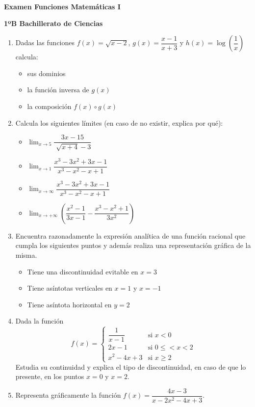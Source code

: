 \documentclass[11pt,a4paper]{article}
\begin{document}
\centerline{{\Large \textbf{Examen Funciones Matemáticas I}}}
\centerline{{\Large \textbf{1ºB Bachillerato de Ciencias}}}

\begin{enumerate}
\item Dadas las funciones $f(x)=\sqrt{x-2}$, $g(x)=\dfrac{x-1}{x+3}$ y $h(x)=\log\left(\dfrac{1}{x}\right)$ calcula:
\begin{itemize}
     \item sus dominios
     \item la función inversa de $g(x)$
     \item la composición $f(x)\circ g(x)$
\end{itemize}

\item Calcula los siguientes límites (en caso de no existir, explica por qué):
\begin{itemize}
     \item $\displaystyle\lim_{x\rightarrow 5}\dfrac{3x-15}{\sqrt[]{x+4}-3}$
     \item $\displaystyle\lim_{x\rightarrow 1}\dfrac{x^3-3x^2+3x-1}{x^3-x^2-x+1}$
     \item $\displaystyle\lim_{x\rightarrow \infty}\dfrac{x^3-3x^2+3x-1}{x^3-x^2-x+1}$
     \item $\displaystyle\lim_{x\rightarrow +\infty}\left(\dfrac{x^2-1}{3x-1}-\dfrac{x^3-x^2+1}{3x^2}\right)$
\end{itemize}


\item Encuentra razonadamente la expresión analítica de una función racional que cumpla los siguientes puntos y además realiza una representación gráfica de la misma.
\begin{itemize}
    \item Tiene una discontinuidad evitable en $x=3$
    \item Tiene asíntotas verticales en $x=1$ y $x=-1$
    \item Tiene asíntota horizontal en $y=2$
\end{itemize}

\item Dada la función
\begin{equation*}f(x)=\left\{
\begin{array}{rl}
\dfrac{1}{x-1} & \text{si } x< 0 \\
2x-1 &\text{si }0\leq<x<2 \\
x^2-4x+3 & \text{si }x\geq 2
\end{array} 
\right.
\end{equation*}
Estudia su continuidad y explica el tipo de discontinuidad, en caso de que lo presente, en los puntos $x=0$ y $x=2$.


\item Representa gráficamente la función $f(x)=\dfrac{4x-3}{x-2x^2-4x+3}$.

\end{enumerate}
\end{document}

